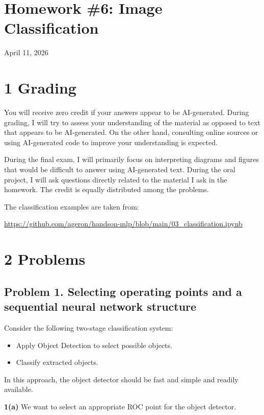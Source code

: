 \documentclass[11pt]{article}
\begin{document}
	
	\section*{Homework \#6: Image Classification}
	April 11, 2026
	
	\section*{1 \quad Grading}
	
	You will receive zero credit if your answers appear to be AI-generated. During grading, I will try to assess your understanding of the material as opposed to text that appears to be AI-generated. On the other hand, consulting online sources or using AI-generated code to improve your understanding is expected.
	
	During the final exam, I will primarily focus on interpreting diagrams and figures that would be difficult to answer using AI-generated text. During the oral project, I will ask questions directly related to the material I ask in the homework. The credit is equally distributed among the problems.
	
	The classification examples are taken from:
	
	\url{https://github.com/ageron/handson-mlp/blob/main/03_classification.ipynb}
	
	\section*{2 \quad Problems}
	
	\subsection*{Problem 1. Selecting operating points and a sequential neural network structure}
	
	Consider the following two-stage classification system:
	
	\begin{itemize}
		\item Apply Object Detection to select possible objects.
		\item Classify extracted objects.
	\end{itemize}
	
	In this approach, the object detector should be fast and simple and readily available.
	
	\textbf{1(a)} We want to select an appropriate ROC point for the object detector.
	
\end{document}
